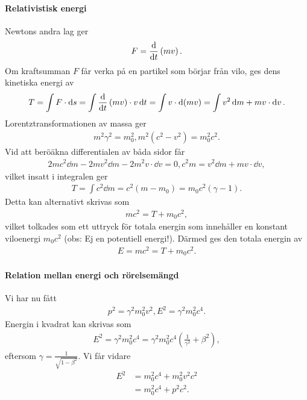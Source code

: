 \paragraph{Relativistisk energi}
Newtons andra lag ger
\begin{align*}
	F = \dv{t}\left(mv\right).
\end{align*}
Om kraftsumman $F$ får verka på en partikel som börjar från vilo, ges dens kinetiska energi av
\begin{align*}
	T = \int F\cdot\dd{s} = \int\dv{t}\left(mv\right)\cdot v\dd{t} = \int v\cdot\dd{(mv)} = \int v^{2}\dd{m} + mv\cdot\dd{v}.
\end{align*}
Lorentztransformationen av massa ger
\begin{align*}
	m^{2}\gamma^{2} = m_{0}^{2}, m^{2}(c^{2} - v^{2}) = m_{0}^{2}c^{2}.
\end{align*}
Vid att beröäkna differentialen av båda sidor får
\begin{align*}
	2mc^{2}\dd{m} - 2mv^{2}\dd{m} - 2m^{2}v\cdot\dd{v} = 0, c^{2}m = v^{2}\dd{m} + mv\cdot\dd{v},
\end{align*}
vilket insatt i integralen ger
\begin{align*}
	T = \int c^{2}\dd{m} = c^{2}(m - m_{0}) = m_{0}c^{2}(\gamma - 1).
\end{align*}
Detta kan alternativt skrivas som
\begin{align*}
	mc^{2} = T + m_{0}c^{2},
\end{align*}
vilket tolkades som ett uttryck för totala energin som innehåller en konstant viloenergi $m_{0}c^{2}$ (obs: Ej en potentiell energi!). Därmed ges den totala energin av
\begin{align*}
	E = mc^{2} = T + m_{0}c^{2}.
\end{align*}

\paragraph{Relation mellan energi och rörelsemängd}
Vi har nu fått
\begin{align*}
	p^{2} = \gamma^{2}m_{0}^{2}v^{2}, E^{2} = \gamma^{2}m_{0}^{2}c^{4}.
\end{align*}
Energin i kvadrat kan skrivas som
\begin{align*}
	E^{2} = \gamma^{2}m_{0}^{2}c^{4} = \gamma^{2}m_{0}^{2}c^{4}\left(\frac{1}{\gamma^{2}} + \beta^{2}\right),
\end{align*}
eftersom $\gamma = \frac{1}{\sqrt{1 - \beta^{2}}}$. Vi får vidare
\begin{align*}
	E^{2} &= m_{0}^{2}c^{4} + m_{0}^{2}v^{2}c^{2} \\
	      &= m_{0}^{2}c^{4} + p^{2}c^{2}.
\end{align*}